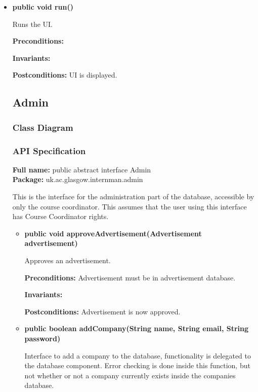 \documentclass[12pt]{article}
\begin{document}
\begin{itemize}

\item{\textbf{public void run()}

Runs the UI.

\textbf{Preconditions:} 

\textbf{Invariants:}

\textbf{Postconditions:} UI is displayed.}

\subsection{Admin}

\subsubsection{Class Diagram}

\subsubsection{API Specification}

\textbf{Full name:} public abstract interface Admin\\

\textbf{Package:} uk.ac.glasgow.internman.admin

This is the interface for the administration part of the database, accessible by
only the course coordinator.
This assumes that the user using this interface has Course Coordinator
rights.

\begin{itemize}

\item{\textbf{public void approveAdvertisement(Advertisement advertisement)}

Approves an advertisement.

\textbf{Preconditions:} Advertisement must be in advertisement database.

\textbf{Invariants:}

\textbf{Postconditions:} Advertisement is now approved.}

\item{\textbf{public boolean addCompany(String name, String email, String
    password)} 

Interface to add a company to the database, functionality is delegated to the
database component.
Error checking is done inside this function, but not whether or not a company
currently exists inside the companies database.

}
\end{itemize}
\end{itemize}
\end{document}
